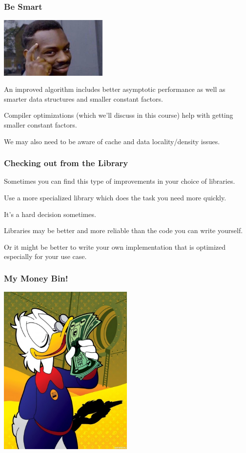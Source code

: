 \begin{frame}
\frametitle{Be Smart}

\begin{center}
	\includegraphics[width=0.4\textwidth]{images/besmart.jpg}
\end{center}


An improved algorithm includes better asymptotic performance
as well as smarter data structures and smaller constant factors.


Compiler optimizations (which we'll discuss in this course) help with
getting smaller constant factors. 

We may also need to be aware of cache
and data locality/density issues.

\end{frame}



\begin{frame}
\frametitle{Checking out from the Library}

Sometimes you can find this type of improvements in your choice of
libraries.

Use a more specialized library which does the
task you need more quickly.
 
It's a hard decision sometimes. 

Libraries may be better and more reliable than the code you can write yourself. 

Or it might be better to write your own implementation that is optimized especially for your use case.

\end{frame}


\begin{frame}
\frametitle{My Money Bin!}

\begin{center}
	\includegraphics[width=0.5\textwidth]{images/scrooge.jpg}
\end{center}

\end{frame}


